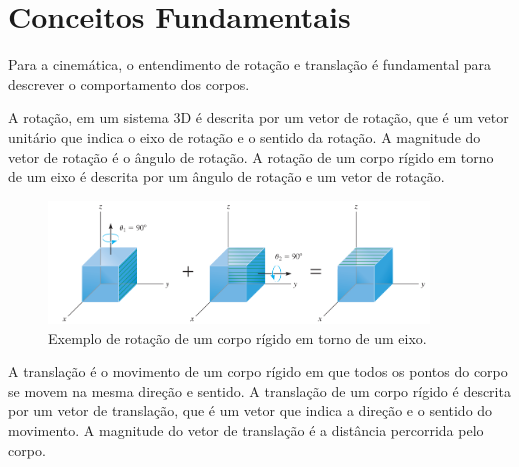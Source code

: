 \section{Conceitos Fundamentais}
\label{sec:conceitos}

Para a cinemática, o entendimento de rotação e translação é fundamental para descrever o comportamento dos corpos.

A rotação, em um sistema 3D é descrita por um vetor de rotação, que é um vetor unitário que indica o eixo de rotação e o sentido da rotação. A magnitude do vetor de rotação é o ângulo de rotação. A rotação de um corpo rígido em torno de um eixo é descrita por um ângulo de rotação e um vetor de rotação.

\begin{figure}[H]
    \centering
    \includegraphics[width=0.9\textwidth]{images/rotacoes}
    \caption{Exemplo de rotação de um corpo rígido em torno de um eixo.}
    \label{fig:rotacao}
\end{figure}

A translação é o movimento de um corpo rígido em que todos os pontos do corpo se movem na mesma direção e sentido. A translação de um corpo rígido é descrita por um vetor de translação, que é um vetor que indica a direção e o sentido do movimento. A magnitude do vetor de translação é a distância percorrida pelo corpo.